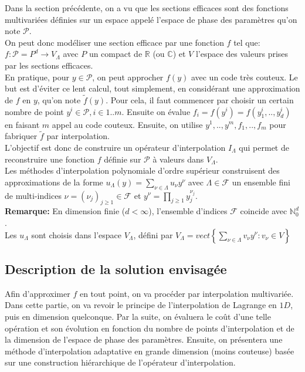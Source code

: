 Dans la section précédente, on a vu que les sections efficaces sont des fonctions multivariées
définies sur un espace appelé l'espace de phase des paramètres qu'on note $\mathcal{P}$. \\
On peut donc modéliser une section efficace par une fonction $f$ tel que: \\
$f:\mathcal{P} = P^d \rightarrow V_{\Lambda}$ avec $P$ un compact de $\mathbb{R}$ (ou $\mathbb{C}$) et
$V$ l'espace des valeurs prises par les sections efficaces. \\

En pratique, pour $y \in \mathcal{P}$, on peut approcher $f(y)$ avec un code très couteux. Le but est d'éviter ce lent
calcul, tout simplement, en considérant une approximation de $f$ en $y$, qu'on note $\tilde{f}(y)$.
Pour cela, il faut commencer par choisir un certain nombre de point $y^i \in \mathcal{P}, i \in 1..m$. Ensuite on
évalue $f_i = f(y^i) = f(y_1^i, .. , y_d^i)$ en faisant $m$ appel au code couteux. Ensuite, on utilise
$y^1,..,y^m,f_1,..,f_m$ pour fabriquer $\tilde{f}$ par interpolation.\\

L'objectif est donc de construire un opérateur d'interpolation $I_{\Lambda}$ qui permet de reconstruire une
fonction $f$ définie sur $\mathcal{P}$ à valeurs dans $V_{\Lambda}$. \\
Les méthodes d'interpolation polynomiale d'ordre supérieur construisent des approximations de la forme
$u_{\Lambda}(y) = \sum_{\nu \in \Lambda} u_{\nu} y^{\nu}$ avec $\Lambda \in \mathcal{F}$ un ensemble fini de multi-indices
$\nu = (\nu_j)_{j \geq 1} \in \mathcal{F}$ et $y^{\nu} = \prod_{j \geq 1} y_j ^ {\nu_j}$. \\

\textbf{Remarque:}
En dimension finie ($d < \infty$), l'ensemble d'indices $\mathcal{F}$ coincide avec $\mathbb{N}_0^d$.\\
Les $u_{\Lambda}$ sont choisis dans l'espace $V_{\Lambda}$, défini par $V_{\Lambda} = vect \left \{ \sum_{\nu \in \Lambda} v_{\nu} y^{\nu} : v_{\nu} \in V \right \}$

\subsection{Description de la solution envisagée}\label{sec:4.1}
\hspace{0.5cm}
Afin d'approximer $f$ en tout point, on va procéder par interpolation multivariée. Dans cette partie, on va revoir le principe de
l'interpolation de Lagrange en $1D$, puis en dimension quelconque. Par la suite, on évaluera le coût d'une telle opération et son évolution en fonction
du nombre de points d'interpolation et de la dimension de l'espace de phase des paramètres.
Ensuite, on présentera une méthode d'interpolation adaptative en grande dimension (moins couteuse) basée sur une construction hiérarchique de l'opérateur d'interpolation. \\

